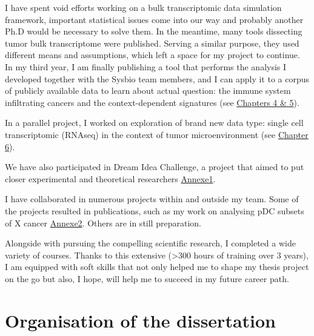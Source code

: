 \documentclass[12pt,]{book}
\theoremstyle{definition}
\theoremstyle{definition}
\theoremstyle{definition}
\theoremstyle{remark}
\begin{document}
I have spent void efforts working on a bulk transcriptomic data
simulation framework, important statistical issues come into our way and
probably another Ph.D would be necessary to solve them. In the meantime,
many tools dissecting tumor bulk transcriptome were published. Serving a
similar purpose, they used different means and assumptions, which left a
space for my project to continue. In my third year, I am finally
publishing a tool that performs the analysis I developed together with
the Sysbio team members, and I can apply it to a corpus of publicly
available data to learn about actual question: the immune system
infiltrating cancers and the context-dependent signatures (see
\protect\hyperlink{deconica}{Chapters 4 \& 5}).

In a parallel project, I worked on exploration of brand new data type:
single cell transcriptomic (RNAseq) in the context of tumor
microenvironment (see \protect\hyperlink{map}{Chapter 6}).

We have also participated in Dream Idea Challenge, a project that aimed
to put closer experimental and theoretical researchers
\citep{Azencott2017}\href{}{Annexe1}.

I have collaborated in numerous projects within and outside my team.
Some of the projects resulted in publications, such as my work on
analysing pDC subsets of X cancer \href{}{Annexe2}. Others are in still
preparation.

Alongside with pursuing the compelling scientific research, I completed
a wide variety of courses. Thanks to this extensive (\textgreater{}300
hours of training over 3 years), I am equipped with soft skills that not
only helped me to shape my thesis project on the go but also, I hope,
will help me to succeed in my future career path.

\hypertarget{organisation-of-the-dissertation}{%
\chapter*{Organisation of the
dissertation}\label{organisation-of-the-dissertation}}

\end{document}
